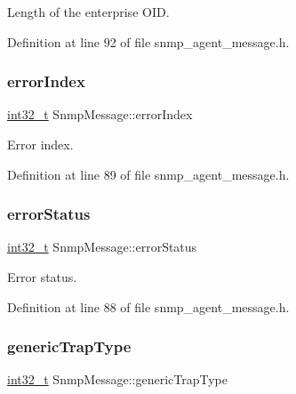 Length of the enterprise O\+ID. 



Definition at line 92 of file snmp\+\_\+agent\+\_\+message.\+h.

\mbox{\label{structSnmpMessage_a6be5f10373d70dd0972a43a24299a8f7}} 
\subsubsection{\texorpdfstring{error\+Index}{errorIndex}}
{\footnotesize\ttfamily \hyperlink{stdint_8h_ab1967d8591af1a4e48c37fd2b0f184d0}{int32\+\_\+t} Snmp\+Message\+::error\+Index}



Error index. 



Definition at line 89 of file snmp\+\_\+agent\+\_\+message.\+h.

\mbox{\label{structSnmpMessage_afb6f5e5cf7da54678aff6c79dd5948ce}} 
\subsubsection{\texorpdfstring{error\+Status}{errorStatus}}
{\footnotesize\ttfamily \hyperlink{stdint_8h_ab1967d8591af1a4e48c37fd2b0f184d0}{int32\+\_\+t} Snmp\+Message\+::error\+Status}



Error status. 



Definition at line 88 of file snmp\+\_\+agent\+\_\+message.\+h.

\mbox{\label{structSnmpMessage_abef516557dd784fbaffa335e9e63353c}} 
\subsubsection{\texorpdfstring{generic\+Trap\+Type}{genericTrapType}}
{\footnotesize\ttfamily \hyperlink{stdint_8h_ab1967d8591af1a4e48c37fd2b0f184d0}{int32\+\_\+t} Snmp\+Message\+::generic\+Trap\+Type}



